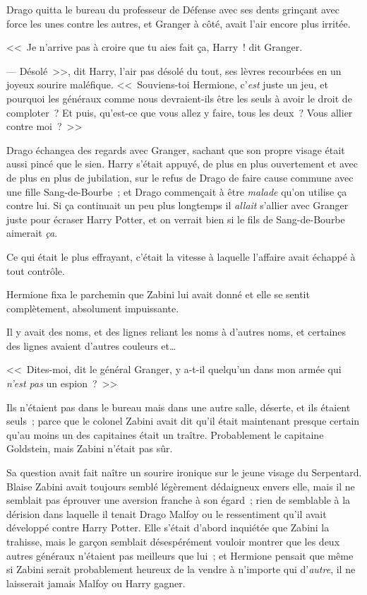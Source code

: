 Drago quitta le bureau du professeur de Défense avec ses dents grinçant avec force les unes contre les autres, et Granger à côté, avait l'air encore plus irritée.

<<~Je n'arrive pas à croire que tu aies fait ça, Harry~! dit Granger.

--- Désolé~>>, dit Harry, l'air pas désolé du tout, ses lèvres recourbées en un joyeux sourire maléfique. <<~Souviens-toi Hermione, c'\emph{est} juste un jeu, et pourquoi les généraux comme nous devraient-ils être les seuls à avoir le droit de comploter~? Et puis, qu'est-ce que vous allez y faire, tous les deux~? Vous allier contre moi~?~>>

Drago échangea des regards avec Granger, sachant que son propre visage était aussi pincé que le sien. Harry s'était appuyé, de plus en plus ouvertement et avec de plus en plus de jubilation, sur le refus de Drago de faire cause commune avec une fille Sang-de-Bourbe~; et Drago commençait à être \emph{malade} qu'on utilise ça contre lui. Si ça continuait un peu plus longtemps il \emph{allait} s'allier avec Granger juste pour écraser Harry Potter, et on verrait bien si le fils de Sang-de-Bourbe aimerait \emph{ça}.

\later

Ce qui était le plus effrayant, c'était la vitesse à laquelle l'affaire avait échappé à tout contrôle.

Hermione fixa le parchemin que Zabini lui avait donné et elle se sentit complètement, absolument impuissante.

Il y avait des noms, et des lignes reliant les noms à d'autres noms, et certaines des lignes avaient d'autres couleurs et…

<<~Dites-moi, dit le général Granger, y a-t-il quelqu'un dans mon armée qui \emph{n'est pas} un espion~?~>>

Ils n'étaient pas dans le bureau mais dans une autre salle, déserte, et ils étaient seuls~; parce que le colonel Zabini avait dit qu'il était maintenant presque certain qu'au moins un des capitaines était un traître. Probablement le capitaine Goldstein, mais Zabini n'était pas sûr.

Sa question avait fait naître un sourire ironique sur le jeune visage du Serpentard. Blaise Zabini avait toujours semblé légèrement dédaigneux envers elle, mais il ne semblait pas éprouver une aversion franche à son égard~; rien de semblable à la dérision dans laquelle il tenait Drago Malfoy ou le ressentiment qu'il avait développé contre Harry Potter. Elle s'était d'abord inquiétée que Zabini la trahisse, mais le garçon semblait désespérément vouloir montrer que les deux autres généraux n'étaient pas meilleurs que lui~; et Hermione pensait que même si Zabini serait probablement heureux de la vendre à n'importe qui d'\emph{autre}, il ne laisserait jamais Malfoy ou Harry gagner.

